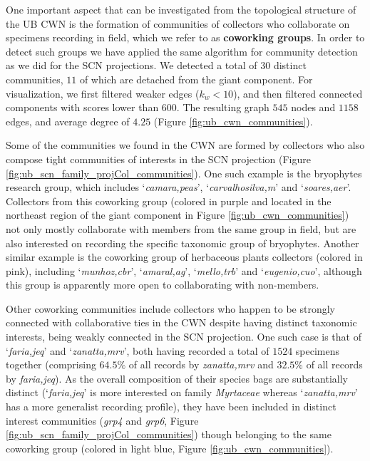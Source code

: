 One important aspect that can be investigated from the topological structure of the UB CWN is the formation of communities of collectors who collaborate on specimens recording in field, which we refer to as \textbf{coworking groups}. 
%
In order to detect such groups we have applied the same algorithm for community detection \cite{Blondel2008} as we did for the SCN projections.
%
We detected a total of $30$ distinct communities, $11$ of which are detached from the giant component.
%
For visualization, we first filtered weaker edges ($k_w < 10$), and then filtered connected components with scores lower than $600$.
The resulting graph $545$ nodes and $1158$ edges, and average degree of $4.25$ (Figure \ref{fig:ub_cwn_communities}).

Some of the communities we found in the CWN are formed by collectors who also compose tight communities of interests in the SCN projection (Figure \ref{fig:ub_scn_family_projCol_communities}).
%
One such example is the bryophytes research group, which includes `\textit{camara,peas}', `\textit{carvalhosilva,m}' and `\textit{soares,aer}'.
Collectors from this coworking group (colored in purple and located in the northeast region of the giant component in Figure \ref{fig:ub_cwn_communities}) not only mostly collaborate with members from the same group in field, but are also interested on recording the specific taxonomic group of bryophytes.
%
Another similar example is the coworking group of herbaceous plants collectors (colored in pink), including `\textit{munhoz,cbr}', `\textit{amaral,ag}', `\textit{mello,trb}' and `\textit{eugenio,cuo}', although this group is apparently more open to collaborating with non-members.

Other coworking communities include collectors who happen to be strongly connected with collaborative ties in the CWN despite having distinct taxonomic interests, being weakly connected in the SCN projection.
One such case is that of `\textit{faria,jeq}' and `\textit{zanatta,mrv}', both having recorded a total of $1524$ specimens together (comprising $64.5\%$ of all records by \textit{zanatta,mrv} and $32.5\%$ of all records by \textit{faria,jeq}).
As the overall composition of their species bags are substantially distinct (`\textit{faria,jeq}' is more interested on family \textit{Myrtaceae} whereas `\textit{zanatta,mrv}' has a more generalist recording profile), they have been included in distinct interest communities (\textit{grp4} and \textit{grp6}, Figure \ref{fig:ub_scn_family_projCol_communities}) though belonging to the same coworking group (colored in light blue, Figure \ref{fig:ub_cwn_communities}).

